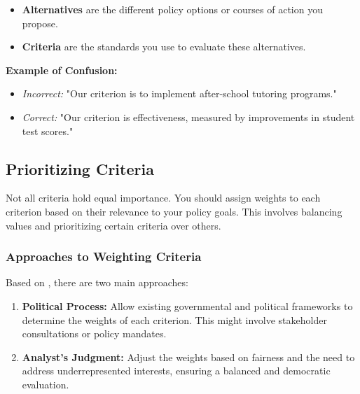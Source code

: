 \documentclass{article}
\theoremstyle{definition}
\theoremstyle{plain}
\begin{document}
\begin{itemize}
    \item \textbf{Alternatives} are the different policy options or courses of action you propose.
    
    \item \textbf{Criteria} are the standards you use to evaluate these alternatives.
\end{itemize}

\textbf{Example of Confusion:}

\begin{itemize}
    \item \textit{Incorrect:} "Our criterion is to implement after-school tutoring programs."
    
    \item \textit{Correct:} "Our criterion is effectiveness, measured by improvements in student test scores."
\end{itemize}

\subsection{Prioritizing Criteria}

Not all criteria hold equal importance. You should assign weights to each criterion based on their relevance to your policy goals. This involves balancing values and prioritizing certain criteria over others.

\subsubsection{Approaches to Weighting Criteria}

Based on \citet{Bardach2020}, there are two main approaches:

\begin{enumerate}[label=\arabic*.]
    \item \textbf{Political Process:} Allow existing governmental and political frameworks to determine the weights of each criterion. This might involve stakeholder consultations or policy mandates.
    
    \item \textbf{Analyst's Judgment:} Adjust the weights based on fairness and the need to address underrepresented interests, ensuring a balanced and democratic evaluation.
\end{enumerate}
\end{document}
